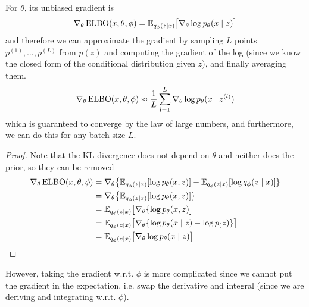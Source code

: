  \begin{lemma}
    For $\theta$, its unbiased gradient is 
    \begin{equation}
      \nabla_\theta \elbo(x, \theta, \phi) = \mathbb{E}_{q_\phi (z \mid x)} \big[ \nabla_\theta \log p_\theta (x \mid z) \big]
    \end{equation}
    and therefore we can approximate the gradient by sampling $L$ points $p^{(1)}, \ldots, p^{(L)}$ from $p(z)$ and computing the gradient of the log (since we know the closed form of the conditional distribution given $z$), and finally averaging them. 
    \begin{equation}
      \nabla_\theta \elbo(x, \theta, \phi) \approx \frac{1}{L} \sum_{l=1}^L \nabla_\theta \log p_\theta (x \mid z^{(l)})
    \end{equation}
    which is guaranteed to converge by the law of large numbers, and furthermore, we can do this for any batch size $L$.  
  \end{lemma}
  \begin{proof}
    Note that the KL divergence does not depend on $\theta$ and neither does the prior, so they can be removed 
    \begin{align} 
      \nabla_\theta \elbo(x, \theta, \phi) & = \nabla_\theta \big\{ \mathbb{E}_{q_\phi (z \mid x)} [ \log p_\theta (x, z)] - \mathbb{E}_{q_\phi (z \mid x)} [\log q_{\phi} (z \mid x)] \} \\ 
                                           & = \nabla_\theta \big\{ \mathbb{E}_{q_\phi (z \mid x)} [ \log p_\theta (x, z)] \} \\ 
                                           & = \mathbb{E}_{q_\phi (z \mid x)} \big[ \nabla_\theta \{ \log p_\theta (x, z) \big] \\
                                           & = \mathbb{E}_{q_\phi (z \mid x)} \big[ \nabla_\theta \{ \log p_\theta (x \mid z) - \log p_(z) \} \big] \\
                                           & = \mathbb{E}_{q_\phi (z \mid x)} \big[ \nabla_\theta \log p_\theta (x \mid z) \big] 
    \end{align}
  \end{proof}

  However, taking the gradient w.r.t. $\phi$ is more complicated since we cannot put the gradient in the expectation, i.e. swap the derivative and integral (since we are deriving and integrating w.r.t. $\phi$). 

